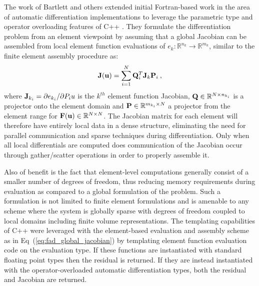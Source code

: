 The work of Bartlett and others \cite{bartlett_automatic_2006}
extended initial Fortran-based work in the area of automatic
differentiation implementations to leverage the parametric type and
operator overloading features of C++ \cite{stroustrup_c++_1997}. They
formulate the differentiation problem from an element viewpoint by
assuming that a global Jacobian can be assembled from local element
function evaluations of $e_k : \mathbb{R}^{n_k} \rightarrow
\mathbb{R}^{m_k}$, similar to the finite element assembly procedure
as:
\begin{equation}
  \mathbf{J}(\mathbf{u}) = \sum_{i=1}^N \mathbf{Q}^T_i \mathbf{J}_k \mathbf{P}_i\:,
  \label{eq:fad_global_jacobian}
\end{equation}
where $\mathbf{J}_{k_i} = \partial e_{k_i} / \partial P_i u$ is the
$k^{th}$ element function Jacobian, $\mathbf{Q} \in \mathbb{R}^{N \times
  n_{k_i}}$ is a projector onto the element domain and $\mathbf{P} \in
\mathbb{R}^{m_{k_i} \times N}$ a projector from the element range for
$\mathbf{F}(\mathbf{u}) \in \mathbb{R}^{N \times N}$. The Jacobian matrix for
each element will therefore have entirely local data in a dense
structure, eliminating the need for parallel communication and sparse
techniques during differentiation. Only when all local differentials
are computed does communication of the Jacobian occur through
gather/scatter operations in order to properly assemble it.

Also of benefit is the fact that element-level computations generally
consist of a smaller number of degrees of freedom, thus reducing
memory requirements during evaluation as compared to a global
formulation of the problem. Such a formulation is not limited to
finite element formulations and is amenable to any scheme where the
system is globally sparse with degrees of freedom coupled to local
domains including finite volume representations. The templating
capabilities of C++ were leveraged with the element-based evaluation
and assembly scheme as in Eq~(\ref{eq:fad_global_jacobian}) by
templating element function evaluation code on the evaluation type. If
these functions are instantiated with standard floating point types
then the residual is returned. If they are instead instantiated with
the operator-overloaded automatic differentiation types, both the
residual and Jacobian are returned.

